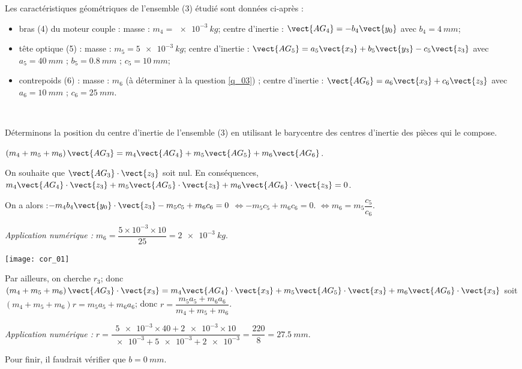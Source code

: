 Les caractéristiques géométriques de l’ensemble (3) étudié sont données ci-après :
\begin{itemize}
\item bras (4) du moteur couple : masse : $m_4=\SI{e-3}{kg}$; centre d’inertie : $\vect{AG_4} = - b_4 \vect{y_0}$ avec $b_4 =  \SI{4}{mm}$;
\item tête optique (5) : masse : $m_5= \SI{5e-3}{kg}$; centre d’inertie : $\vect{AG_5}= a_5 \vect{x_3}+b_5 \vect{y_3}-c_5 \vect{z_3}$ avec $a_5 = \SI{40}{mm}$ ; $b_5 = \SI{0,8}{mm}$ ; $c_5 = \SI{10}{mm}$;
\item contrepoids (6) : masse : $m_6$ (à déterminer à la question \ref{q_03}) ; centre d’inertie :
$\vect{AG_6}= a_6 \vect{x_3}+c_6 \vect{z_3}$ avec $a_6 = \SI{10}{mm}$ ; $c_6 = \SI{25}{mm}$.
\end{itemize}
\fi

\ifprof
\begin{corrige} ~\\
\begin{minipage}[c]{.7\linewidth}
Déterminons la position du centre d'inertie de l'ensemble (3) en utilisant le barycentre des centres d'inertie des pièces qui le compose.

$\left(m_4 + m_5 +m_6 \right) \vect{AG_3} = m_4 \vect{AG_4}+m_5 \vect{AG_5}+m_6 \vect{AG_6} $. 

On souhaite que  $\vect{AG_3}\cdot \vect{z_3}$ soit nul. En conséquences, 
$ m_4 \vect{AG_4} \cdot \vect{z_3}+m_5 \vect{AG_5}\cdot \vect{z_3}+m_6 \vect{AG_6}\cdot \vect{z_3} = 0 $. 

On a alors :$ - m_4 b_4 \vect{y_0} \cdot \vect{z_3} - m_5 c_5 +m_6 c_6  = 0 $
$\Leftrightarrow  - m_5 c_5 +m_6 c_6  = 0 $.
$\Leftrightarrow   m_6   = m_5 \dfrac{c_5}{c_6}$.
 
\textit{Application numérique : } $m_6 = \dfrac{5\times 10^{-3} \times 10}{25} = \SI{2e-3}{kg}$.

\end{minipage} \hfill
\begin{minipage}[c]{.25\linewidth}
\begin{center}
\texttt{[image: cor\_01]}
\end{center}
\end{minipage}

Par ailleurs, on cherche $r_3$; donc
$\left(m_4 + m_5 +m_6 \right) \vect{AG_3}\cdot \vect{x_3} = m_4 \vect{AG_4}\cdot \vect{x_3}+m_5 \vect{AG_5}\cdot \vect{x_3}+m_6 \vect{AG_6}\cdot \vect{x_3} $  
soit 
$\left(m_4 + m_5 +m_6 \right) r =m_5 a_5+m_6 a_6 $; donc $ r =\dfrac{m_5 a_5+ m_6a_6}{m_4 + m_5 +m_6 } $.

\textit{Application numérique : } $r = \dfrac{\num{5e-3}\times 40 + \num{2e-3}\times 10}{\num{e-3}+ \num{5e-3} + \num{2e-3}} = \dfrac{220}{8}=\SI{27,5}{mm}$.

Pour finir, il faudrait vérifier que $b=\SI{0}{mm}$.
\end{corrige}
\else
\fi

